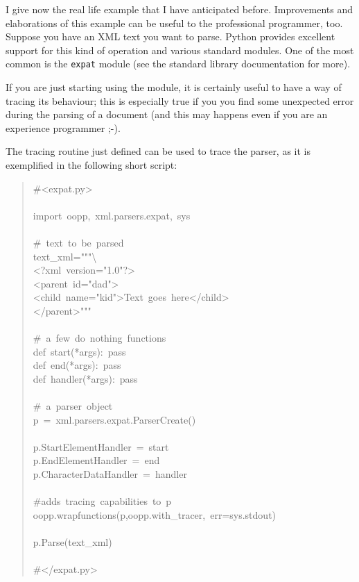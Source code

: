 \documentclass[10pt,english]{article}
\begin{document}
I give  now the real life example that I have anticipated before.
Improvements and elaborations of this example can be useful to the
professional programmer, too. Suppose you have an XML text you want
to parse. Python provides excellent support for this kind of operation
and various standard modules. One of the most common is the \texttt{expat}
module (see the standard library documentation for more).

If you are just starting using the module, it is certainly useful
to have a way of tracing its behaviour; this is especially true if
you you find some unexpected error during the parsing of a document
(and this may happens even if you are an experience programmer ;-).

The tracing routine just defined can be used to trace the parser, as
it is exemplified in the following short script:
\begin{quote}
\begin{ttfamily}\begin{flushleft}
\mbox{{\#}<expat.py>}\\
\mbox{}\\
\mbox{import~oopp,~xml.parsers.expat,~sys}\\
\mbox{}\\
\mbox{{\#}~text~to~be~parsed}\\
\mbox{text{\_}xml="""{\textbackslash}}\\
\mbox{<?xml~version="1.0"?>}\\
\mbox{<parent~id="dad">}\\
\mbox{<child~name="kid">Text~goes~here</child>}\\
\mbox{</parent>"""}\\
\mbox{}\\
\mbox{{\#}~a~few~do~nothing~functions}\\
\mbox{def~start(*args):~pass}\\
\mbox{def~end(*args):~pass}\\
\mbox{def~handler(*args):~pass}\\
\mbox{}\\
\mbox{{\#}~a~parser~object}\\
\mbox{p~=~xml.parsers.expat.ParserCreate()}\\
\mbox{}\\
\mbox{p.StartElementHandler~=~start}\\
\mbox{p.EndElementHandler~=~end}\\
\mbox{p.CharacterDataHandler~=~handler}\\
\mbox{}\\
\mbox{{\#}adds~tracing~capabilities~to~p}\\
\mbox{oopp.wrapfunctions(p,oopp.with{\_}tracer,~err=sys.stdout)}\\
\mbox{}\\
\mbox{p.Parse(text{\_}xml)}\\
\mbox{}\\
\mbox{{\#}</expat.py>}
\end{flushleft}\end{ttfamily}
\end{quote}
\end{document}
